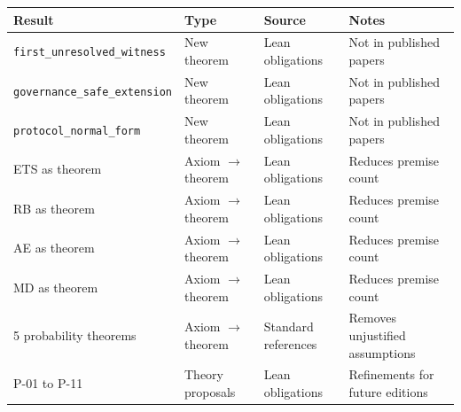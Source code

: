 \begin{center}
\begin{tabular}{llll}
\toprule
Result & Type & Source & Notes \\
\midrule
\texttt{first\_unresolved\_witness} & New theorem & Lean obligations & Not in published papers \\
\texttt{governance\_safe\_extension} & New theorem & Lean obligations & Not in published papers \\
\texttt{protocol\_normal\_form} & New theorem & Lean obligations & Not in published papers \\
ETS as theorem & Axiom $\to$ theorem & Lean obligations & Reduces premise count \\
RB as theorem & Axiom $\to$ theorem & Lean obligations & Reduces premise count \\
AE as theorem & Axiom $\to$ theorem & Lean obligations & Reduces premise count \\
MD as theorem & Axiom $\to$ theorem & Lean obligations & Reduces premise count \\
5 probability theorems & Axiom $\to$ theorem & Standard references & Removes unjustified assumptions \\
P-01 to P-11 & Theory proposals & Lean obligations & Refinements for future editions \\
\bottomrule
\end{tabular}
\end{center}
